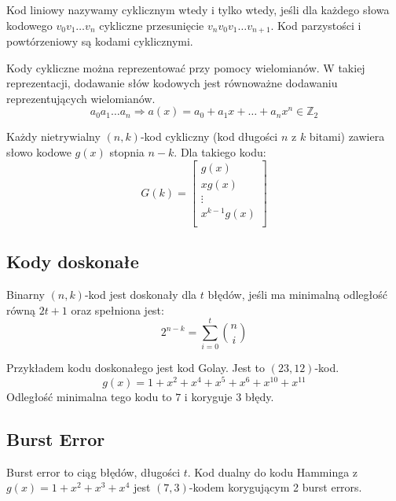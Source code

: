 \documentclass{../notatki}
\begin{document}
Kod liniowy nazywamy cyklicznym wtedy i tylko wtedy, jeśli dla każdego słowa
kodowego $v_0v_1 \dots v_n$ cykliczne przesunięcie $v_{n}v_0v_1\dots v_{n + 1}$.
Kod parzystości i powtórzeniowy są kodami cyklicznymi.

Kody cykliczne można reprezentować przy pomocy wielomianów. W takiej
reprezentacji, dodawanie słów kodowych jest równoważne dodawaniu
reprezentujących wielomianów.
$$
a_0a_1\dots a_n \Rightarrow a(x) = a_0 + a_1x + \dots + a_nx^n \in \mathbb{Z}_2
$$

Każdy nietrywialny $(n, k)$-kod cykliczny (kod długości $n$ z $k$ bitami)
zawiera słowo kodowe $g(x)$ stopnia $n - k$. Dla takiego kodu:
$$
G(k) =
\begin{bmatrix}
  g(x) \\
  xg(x) \\
  \vdots \\
  x^{k - 1}g(x) \\
\end{bmatrix}
$$

\subsection{Kody doskonałe}

Binarny $(n, k)$-kod jest doskonały dla $t$ błędów, jeśli ma minimalną odległość
równą $2t + 1$ oraz spełniona jest:
$$
2^{n - k} = \sum_{i = 0}^{t} \binom{n}{i}
$$

Przykładem kodu doskonałego jest kod Golay. Jest to $(23, 12)$-kod.
$$
g(x) = 1 + x^2 + x^4 + x^5 + x^6 + x^10 + x^11
$$
Odległość minimalna tego kodu to $7$ i koryguje $3$ błędy.

\subsection{Burst Error}

Burst error to ciąg błędów, długości $t$. Kod dualny do kodu Hamminga z
$g(x)=1 + x^2 + x^3 + x^4$ jest $(7,3)$-kodem korygującym 2 burst errors.
\end{document}
